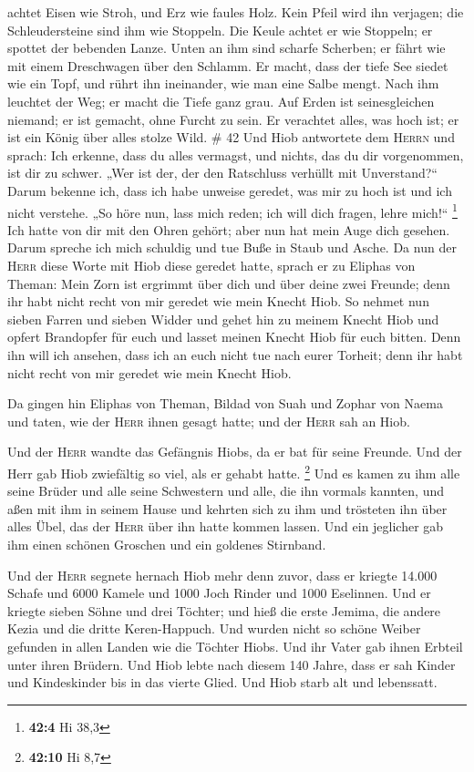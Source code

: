 achtet Eisen wie Stroh, und Erz wie faules Holz.  Kein
Pfeil wird ihn verjagen; die Schleudersteine sind ihm wie Stoppeln.
 Die Keule achtet er wie Stoppeln; er spottet der
bebenden Lanze.  Unten an ihm sind scharfe Scherben; er
fährt wie mit einem Dreschwagen über den Schlamm.  Er
macht, dass der tiefe See siedet wie ein Topf, und rührt ihn ineinander,
wie man eine Salbe mengt.  Nach ihm leuchtet der Weg; er
macht die Tiefe ganz grau.  Auf Erden ist seinesgleichen
niemand; er ist gemacht, ohne Furcht zu sein.  Er
verachtet alles, was hoch ist; er ist ein König über alles stolze Wild.
\# 42  Und Hiob antwortete dem \textsc{Herrn} und sprach:
 Ich erkenne, dass du alles vermagst, und nichts, das du
dir vorgenommen, ist dir zu schwer.  „Wer ist der, der den
Ratschluss verhüllt mit Unverstand?{}`` Darum bekenne ich, dass ich habe
unweise geredet, was mir zu hoch ist und ich nicht verstehe.
 „So höre nun, lass mich reden; ich will dich fragen,
lehre mich!{}`` \footnote{\textbf{42:4} Hi 38,3}  Ich
hatte von dir mit den Ohren gehört; aber nun hat mein Auge dich gesehen.
 Darum spreche ich mich schuldig und tue Buße in Staub und
Asche.  Da nun der \textsc{Herr} diese Worte mit Hiob
diese geredet hatte, sprach er zu Eliphas von Theman: Mein Zorn ist
ergrimmt über dich und über deine zwei Freunde; denn ihr habt nicht
recht von mir geredet wie mein Knecht Hiob.  So nehmet nun
sieben Farren und sieben Widder und gehet hin zu meinem Knecht Hiob und
opfert Brandopfer für euch und lasset meinen Knecht Hiob für euch
bitten. Denn ihn will ich ansehen, dass ich an euch nicht tue nach eurer
Torheit; denn ihr habt nicht recht von mir geredet wie mein Knecht Hiob.

 Da gingen hin Eliphas von Theman, Bildad von Suah und
Zophar von Naema und taten, wie der \textsc{Herr} ihnen gesagt hatte;
und der \textsc{Herr} sah an Hiob.

 Und der \textsc{Herr} wandte das Gefängnis Hiobs, da er
bat für seine Freunde. Und der Herr gab Hiob zwiefältig so viel, als er
gehabt hatte. \footnote{\textbf{42:10} Hi 8,7}  Und es
kamen zu ihm alle seine Brüder und alle seine Schwestern und alle, die
ihn vormals kannten, und aßen mit ihm in seinem Hause und kehrten sich
zu ihm und trösteten ihn über alles Übel, das der \textsc{Herr} über ihn
hatte kommen lassen. Und ein jeglicher gab ihm einen schönen Groschen
und ein goldenes Stirnband.

 Und der \textsc{Herr} segnete hernach Hiob mehr denn
zuvor, dass er kriegte 14.000 Schafe und 6000 Kamele und 1000 Joch
Rinder und 1000 Eselinnen.  Und er kriegte sieben Söhne
und drei Töchter;  und hieß die erste Jemima, die andere
Kezia und die dritte Keren-Happuch.  Und wurden nicht so
schöne Weiber gefunden in allen Landen wie die Töchter Hiobs. Und ihr
Vater gab ihnen Erbteil unter ihren Brüdern.  Und Hiob
lebte nach diesem 140 Jahre, dass er sah Kinder und Kindeskinder bis in
das vierte Glied.  Und Hiob starb alt und lebenssatt.
